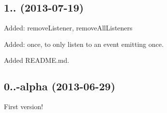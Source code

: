 \subsection*{1.. (2013-\/07-\/19) }


\begin{DoxyItemize}
\item Added\+: remove\+Listener, remove\+All\+Listeners
\item Added\+: once, to only listen to an event emitting once.
\item Added R\+E\+A\+D\+M\+E.\+md.
\end{DoxyItemize}

\subsection*{0..-\/alpha (2013-\/06-\/29) }


\begin{DoxyItemize}
\item First version! 
\end{DoxyItemize}
